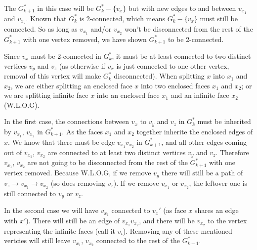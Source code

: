 \documentclass[11pt]{article}
\begin{document}
The $G^*_{k+1}$ in this case will be $G^*_k - \{v_x\}$ but with new edges to and between $v_{x_1}$ and $v_{x_2}$. Known that $G^*_k$ is 2-connected, which means $G^*_k - \{v_x\}$ must still be connected. So as long as $v_{x_1}$ and/or $v_{x_2}$ won't be disconnected from the rest of the $G^*_{k+1}$ with one vertex removed, we have shown $G^*_{k+1}$ to be 2-connected.\newline

Since $v_x$ must be 2-connected in $G^*_k$, it must be at least connected to two distinct vertices $v_y$ and $v_z$ (as otherwise if $v_x$ is just connected to one other vertex, removal of this vertex will make $G^*_k$ disconnected). When splitting $x$ into $x_1$ and $x_2$, we are either splitting an enclosed face $x$ into two enclosed faces $x_1$ and $x_2$; or we are splitting infinite face $x$ into an enclosed face $x_1$ and an infinite face $x_2$ (W.L.O.G).

In the first case, the connections between $v_x$ to $v_y$ and $v_z$ in $G^*_k $ must be inherited by $v_{x_1}$, $v_{x_2}$ in $G^*_{k+1}$. As the faces $x_1$ and $x_2$ together inherite the enclosed edges of $x$. We know that there must be edge $v_{x_1}v_{x_2}$ in $G^*_{k+1}$, and all other edges coming out of $v_{x_1}$, $v_{x_2}$ are connected to at least two distinct vertices $v_y$ and $v_z$. Therefore $v_{x_1}$, $v_{x_2}$ are not going to be disconnected from the rest of the $G^*_{k+1}$ with one vertex removed. Because W.L.O.G, if we remove $v_y$ there will still be a path of $v_z \rightarrow v_{x_1} \rightarrow v_{x_2}$ (so does removing $v_z$). If we remove $v_{x_1}$ or $v_{x_2}$, the leftover one is still connected to $v_y$ or $v_z$.

In the second case we will have $v_{x_1}$ connected to $v_x'$ (as face $x$ shares an edge with $x'$). There will still be an edge of $v_{x_1}v_{x_2}$, and there will be $v_{x_2}$ to the vertex representing the infinite faces (call it $v_i$). Removing any of these mentioned vertcies will still leave $v_{x_1}$, $v_{x_2}$ connected to the rest of the $G^*_{k+1}$.\newline
\end{document}
